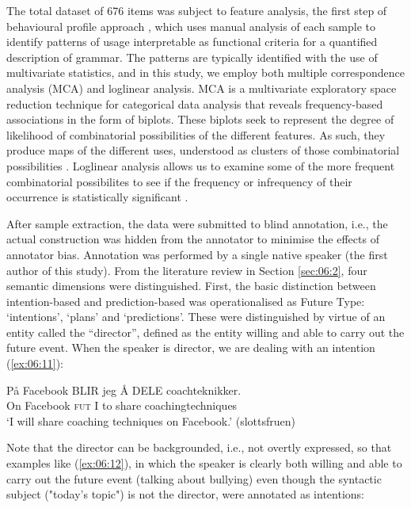 \documentclass[output=paper,colorlinks,citecolor=brown]{langscibook}
\begin{document}
The total dataset of 676 items was subject to feature analysis, the first step of behavioural profile approach \citep{dirven1982, geeraerts1994, gries2003, divjakgries2006}, which uses manual analysis of each sample to identify patterns of usage interpretable as functional criteria for a quantified description of grammar. The patterns are typically identified with the use of multivariate statistics, and in this study, we employ both multiple correspondence analysis (MCA) and loglinear analysis. MCA is a multivariate exploratory space reduction technique for categorical data analysis that reveals frequency-based associations in the form of biplots. These biplots seek to represent the degree of likelihood of combinatorial possibilities of the different features. As such, they produce maps of the different uses, understood as clusters of those combinatorial possibilities \citep{Glynn2014}. Loglinear analysis allows us to examine some of the more frequent combinatorial possibilites to see if the frequency or infrequency of their occurrence is statistically significant \citep{Glynn2014}.

After sample extraction, the data were submitted to blind annotation, i.e., the actual construction was hidden from the annotator to minimise the effects of annotator bias. Annotation was performed by a single native speaker (the first author of this study). From the literature review in Section \ref{sec:06:2}, four semantic dimensions were distinguished. First, the basic distinction between intention-based and prediction-based was operationalised as Future Type: `intentions', `plans' and `predictions'. These were distinguished by virtue of an entity called the “director”, defined as the entity willing and able to carry out the future event. When the speaker is director, we are dealing with an intention (\ref{ex:06:11}):

\ea\label{ex:06:11}
\gll På Facebook BLIR jeg Å DELE coachteknikker. \\
     On Facebook \textsc{fut} I to share coachingtechniques\\
\glt ‘I will share coaching techniques on Facebook.’ (slottsfruen)
\z

Note that the director can be backgrounded, i.e., not overtly expressed, so that examples like (\ref{ex:06:12}), in which the speaker is clearly both willing and able to carry out the future event (talking about bullying) even though the syntactic subject ("today's topic") is not the director, were annotated as intentions:
\end{document}
